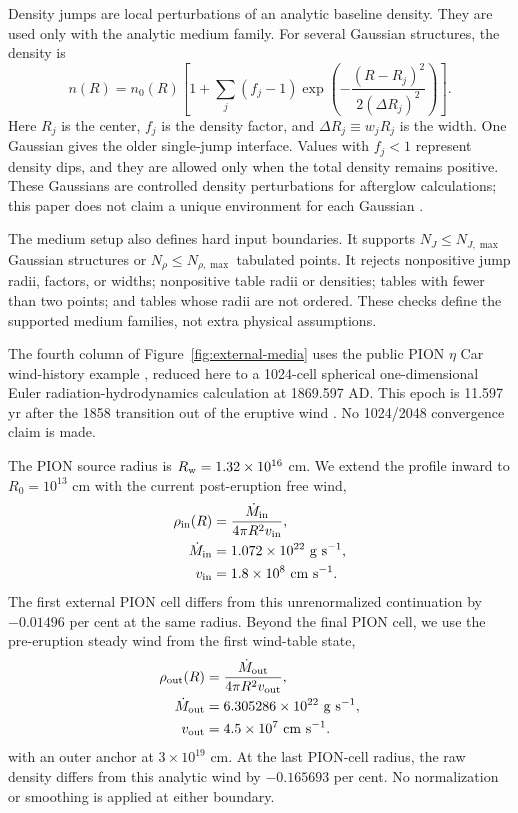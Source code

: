 \documentclass[twocolumn]{aastex702}
\begin{document}
Density jumps are local perturbations of an analytic baseline density.  They are
used only with the analytic medium family.  For several Gaussian structures, the
density is
\begin{equation}
n(R)=n_0(R)
\left[
1+\sum_j
(f_j-1)
\exp\left(
-\frac{(R-R_j)^2}{2(\Delta R_j)^2}
\right)
\right].
\end{equation}
Here \(R_j\) is the center, \(f_j\) is the density factor, and
\(\Delta R_j\equiv w_jR_j\) is the width.  One Gaussian gives the older
single-jump interface.  Values with \(f_j<1\) represent density dips, and they
are allowed only when the total density remains positive.  These Gaussians are
controlled density perturbations for afterglow calculations; this paper does not
claim a unique environment for each Gaussian
\citep{DaiLu2002,NakarGranot2007,UhmZhang2014}.

The medium setup also defines hard input boundaries.  It supports
\(N_J\le N_{J,\max}\) Gaussian structures or \(N_\rho\le N_{\rho,\max}\)
tabulated points.  It rejects nonpositive jump radii, factors, or widths;
nonpositive table radii or densities; tables with fewer than two points; and
tables whose radii are not ordered.  These checks define the supported medium
families, not extra physical assumptions.

The fourth column of Figure~\ref{fig:external-media} uses the public PION
$\eta$ Car wind-history example \citep{Mackey2021PION}, reduced here to a
1024-cell spherical one-dimensional Euler radiation-hydrodynamics calculation
at 1869.597 AD.  This epoch is 11.597 yr after the 1858 transition out of the
eruptive wind \citep{Langer1999EtaCar}.  No 1024/2048 convergence claim is
made.

The PION source radius is $R_{\rm w}=1.32\times10^{16}$ cm.  We extend the
profile inward to $R_0=10^{13}$ cm with the current post-eruption free wind,
\begin{equation}
\begin{aligned}
\rho_{\rm in}(R)&=\frac{\dot M_{\rm in}}{4\pi R^2v_{\rm in}},\\
\dot M_{\rm in}&=1.072\times10^{22}\ {\rm g\ s^{-1}},\\
v_{\rm in}&=1.8\times10^8\ {\rm cm\ s^{-1}} .
\end{aligned}
\end{equation}
The first external PION cell differs from this unrenormalized continuation by
$-0.01496$ per cent at the same radius.  Beyond the final PION cell, we use the
pre-eruption steady wind from the first wind-table state,
\begin{equation}
\begin{aligned}
\rho_{\rm out}(R)&=\frac{\dot M_{\rm out}}{4\pi R^2v_{\rm out}},\\
\dot M_{\rm out}&=6.305286\times10^{22}\ {\rm g\ s^{-1}},\\
v_{\rm out}&=4.5\times10^7\ {\rm cm\ s^{-1}} .
\end{aligned}
\end{equation}
with an outer anchor at $3\times10^{19}$ cm.  At the last PION-cell radius,
the raw density differs from this analytic wind by $-0.165693$ per cent.  No
normalization or smoothing is applied at either boundary.
\end{document}
